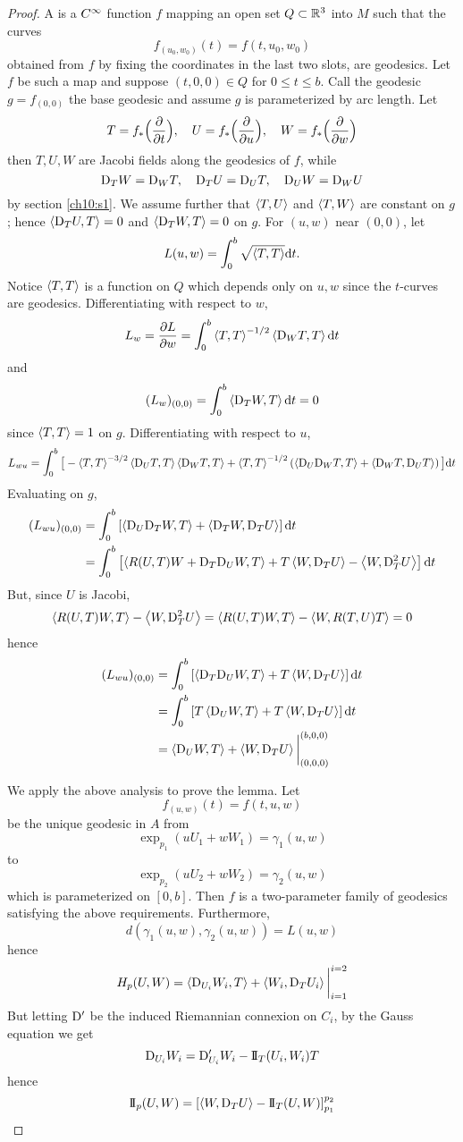 \documentclass[../main]{subfiles}
\begin{document}
\begin{proof}
A  is a $C^\infty$ function $f$ mapping an open set $Q\subset\mathbb{R}^3$ into $M$ such that the curves
\[f_{(u_0,w_0)}(t) = f(t,u_0,w_0)\]
obtained from $f$ by fixing the coordinates in the last two slots, are geodesics. Let $f$ be such a map and suppose $(t,0,0)\in Q$ for $0\le t\le b$. Call the geodesic $g=f_{(0,0)}$ the base geodesic and assume $g$ is parameterized by arc length. Let
\[T = f_*\Big(\dfrac{\partial }{\partial t}\Big),
\quad U = f_*\Big(\dfrac{\partial }{\partial u}\Big),
\quad W = f_*\Big(\dfrac{\partial }{\partial w}\Big)\]
then $T,U,W$ are Jacobi fields along the geodesics of $f$, while
\[\mathrm{D}_TW = \mathrm{D}_WT,
\quad \mathrm{D}_TU = \mathrm{D}_UT,
\quad \mathrm{D}_UW = \mathrm{D}_WU\]
by section \ref{ch10:s1}. We assume further that $\left\langle T,U\right\rangle$ and $\left\langle T,W\right\rangle$ are constant on $g$; hence $\left\langle\mathrm{D}_TU,T\right\rangle=0$ and $\left\langle\mathrm{D}_TW,T\right\rangle=0$ on $g$. For $(u,w)$ near $(0,0)$, let
\[L(u,w) = \int_0^b\sqrt{\left\langle T,T\right\rangle}\mathrm{d}t.\]
Notice $\left\langle T,T\right\rangle$ is a function on $Q$ which depends only on $u,w$ since the $t$-curves are geodesics. Differentiating with respect to $w$,
\[L_w = \dfrac{\partial L}{\partial w}
= \int_0^b\left\langle T,T\right\rangle^{-1/2}\left\langle\mathrm{D}_WT,T\right\rangle\mathrm{d}t\]
and
\[(L_w)_{(0,0)} = \int_0^b\left\langle\mathrm{D}_TW,T\right\rangle\mathrm{d}t = 0\]
since $\left\langle T,T\right\rangle=1$ on $g$. Differentiating with respect to $u$,
\[L_{wu} =\int_0^b\big[-\left\langle T,T\right\rangle^{-3/2}\left\langle\mathrm{D}_UT,T\right\rangle\left\langle\mathrm{D}_WT,T\right\rangle
+\left\langle T,T\right\rangle^{-1/2}\left(\left\langle\mathrm{D}_U\mathrm{D}_WT,T\right\rangle+\left\langle\mathrm{D}_WT,\mathrm{D}_UT\right\rangle\right)\big]\mathrm{d}t\]
Evaluating on $g$,
\begin{align*}
    (L_{wu})_{(0,0)}
    &= \int_0^b\left[\left\langle\mathrm{D}_U\mathrm{D}_TW,T\right\rangle+\left\langle\mathrm{D}_TW,\mathrm{D}_TU\right\rangle\right]\mathrm{d}t \\
    &= \int_0^b\left[\left\langle R(U,T)W+\mathrm{D}_T\mathrm{D}_UW,T\right\rangle + T\left\langle W,\mathrm{D}_TU\right\rangle - \left\langle W,\mathrm{D}_T^2U\right\rangle\right]\mathrm{d}t
\end{align*}
But, since $U$ is Jacobi,
\[\left\langle R(U,T)W,T\right\rangle - \left\langle W,\mathrm{D}_T^2U\right\rangle = \left\langle R(U,T)W,T\right\rangle - \left\langle W,R(T,U)T\right\rangle = 0\]
hence
\begin{align*}
    (L_{wu})_{(0,0)}
    &= \int_0^b\left[\left\langle\mathrm{D}_T\mathrm{D}_UW,T\right\rangle + T\left\langle W,\mathrm{D}_TU\right\rangle\right]\mathrm{d}t \\
    &=\int_0^b\left[T\left\langle\mathrm{D}_UW,T\right\rangle + T\left\langle W,\mathrm{D}_TU\right\rangle\right]\mathrm{d}t \\
    &= \left\langle\mathrm{D}_UW,T\right\rangle + \left\langle W,\mathrm{D}_TU\right\rangle\bigg|_{(0,0,0)}^{(b,0,0)}
\end{align*}

We apply the above analysis to prove the lemma. Let
\[f_{(u,w)}(t) = f(t,u,w)\]
be the unique geodesic in $A$ from
\[\exp_{p_1}(uU_1+wW_1) = \gamma_1(u,w)\]
to
\[\exp_{p_2}(uU_2+wW_2) = \gamma_2(u,w)\]
which is parameterized on $[0,b]$. Then $f$ is a two-parameter family of geodesics satisfying the above requirements. Furthermore,
\[d(\gamma_1(u,w),\gamma_2(u,w)) = L(u,w)\]
hence
\[H_p(U,W) = \left\langle\mathrm{D}_{U_i}W_i,T\right\rangle + \left\langle W_i,\mathrm{D}_TU_i\right\rangle\bigg|_{i=1}^{i=2}\]
But letting $\mathrm{D}'$ be the induced Riemannian connexion on $C_i$, by the Gauss equation we get
\[\mathrm{D}_{U_i}W_i = \mathrm{D}'_{U_i}W_i - \mathrm{I\!I}_T(U_i,W_i)T\]
hence
\[\mathrm{I\!I}_p(U,W) = \left[\left\langle W,\mathrm{D}_TU\right\rangle - \mathrm{I\!I}_T(U,W)\right]_{p_1}^{p_2}\]
\end{proof}
\end{document}
